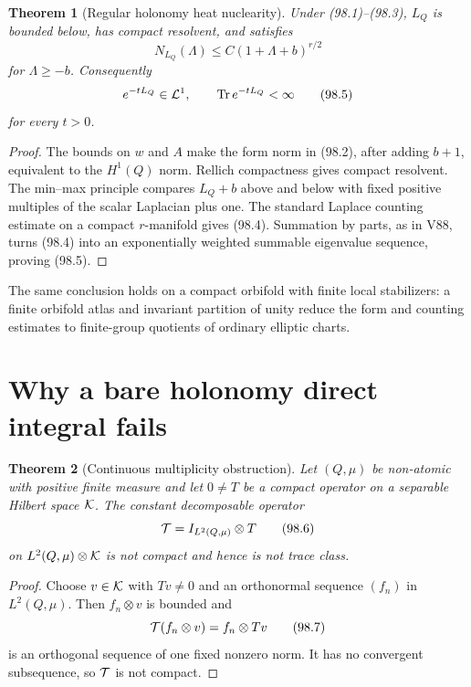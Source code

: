 \documentclass[11pt]{article}
\newtheorem{theorem}{Theorem}[section]
\theoremstyle{remark}
\begin{document}
\begin{theorem}[Regular holonomy heat nuclearity]
\label{thm:v15v98-holonomy}
Under (98.1)--(98.3), \(L_Q\) is bounded below, has compact
resolvent, and satisfies
\[
 N_{L_Q}(\Lambda)
 \leq C(1+\Lambda+b)^{r/2}                            \tag{98.4}
\]
for \(\Lambda\geq-b\).  Consequently
\[
 e^{-tL_Q}\in{\cal L}^1,\qquad
 \operatorname{Tr}e^{-tL_Q}<\infty                   \tag{98.5}
\]
for every \(t>0\).
\end{theorem}

\begin{proof}
The bounds on \(w\) and \(A\) make the form norm in (98.2), after
adding \(b+1\), equivalent to the \(H^1(Q)\) norm.  Rellich
compactness gives compact resolvent.  The min--max principle compares
\(L_Q+b\) above and below with fixed positive multiples of the
scalar Laplacian plus one.  The standard Laplace counting estimate
on a compact \(r\)-manifold gives (98.4).  Summation by parts, as in
V88, turns (98.4) into an exponentially weighted summable
eigenvalue sequence, proving (98.5).
\end{proof}

The same conclusion holds on a compact orbifold with finite local
stabilizers: a finite orbifold atlas and invariant partition of
unity reduce the form and counting estimates to finite-group
quotients of ordinary elliptic charts.

\section{Why a bare holonomy direct integral fails}

\begin{theorem}[Continuous multiplicity obstruction]
\label{thm:v15v98-direct-integral}
Let \((Q,\mu)\) be non-atomic with positive finite measure and let
\(0\ne T\) be a compact operator on a separable Hilbert space
\({\cal K}\).  The constant decomposable operator
\[
 {\cal T}=I_{L^2(Q,\mu)}\otimes T                     \tag{98.6}
\]
on \(L^2(Q,\mu)\otimes{\cal K}\) is not compact and hence is not
trace class.
\end{theorem}

\begin{proof}
Choose \(v\in{\cal K}\) with \(Tv\ne0\) and an orthonormal sequence
\((f_n)\) in \(L^2(Q,\mu)\).  Then \(f_n\otimes v\) is bounded and
\[
 {\cal T}(f_n\otimes v)=f_n\otimes Tv                 \tag{98.7}
\]
is an orthogonal sequence of one fixed nonzero norm.  It has no
convergent subsequence, so \({\cal T}\) is not compact.
\end{proof}
\end{document}
